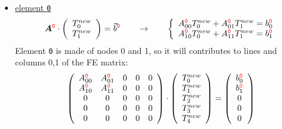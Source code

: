 \begin{itemize}
\item \underline{element {\color{red}\tt 0}}
\[
{\bm A}^{\color{red} \tt 0}  \cdot 
\left(
\begin{array}{c}
T_0^{new} \\ T_1^{new}
\end{array}
\right)
 =  {\vec b}^{\color{red} \tt 0}
\qquad
\rightarrow
\qquad
\left\{ 
\begin{array}{l}
A_{00}^{{\color{red}\tt 0}} T_0^{new} + A_{01}^{{\color{red}\tt 0}} T_1^{new} = b^{{\color{red} \tt 0}}_0 \\
A_{10}^{{\color{red}\tt 0}} T_0^{new} + A_{11}^{{\color{red}\tt 0}} T_1^{new} = b^{{\color{red} \tt 0}}_1
\end{array}
\right.
\]
Element {\color{red}\tt 0} is made of nodes 0 and 1, so it will contributes to lines and columns 0,1 of the FE matrix:
\[
\left( \begin{array}{ccccc}
A_{00}^{{\color{red}\tt 0}} &  A_{01}^{{\color{red}\tt 0}} &0&0&0 \\ 
A_{10}^{{\color{red}\tt 0}} &  A_{11}^{{\color{red} \tt 0}}  &0  &0&0 \\
0 & 0 & 0 & 0 & 0 \\ 
0 & 0 & 0 & 0 & 0 \\ 
0 & 0 & 0 & 0 & 0 
\end{array} \right) \cdot
\left(\begin{array}{c}
T_0^{new} \\ T_1^{new} \\ T_2^{new} \\ T_3^{new} \\ T_4^{new}
\end{array} \right)
=
\left(\begin{array}{c}
b_{0}^{{\color{red}\tt 0}} \\  b_{1}^{{\color{red}\tt 0}} \\  0 \\  0 \\ 0
\end{array}\right)
\]






\end{itemize}

